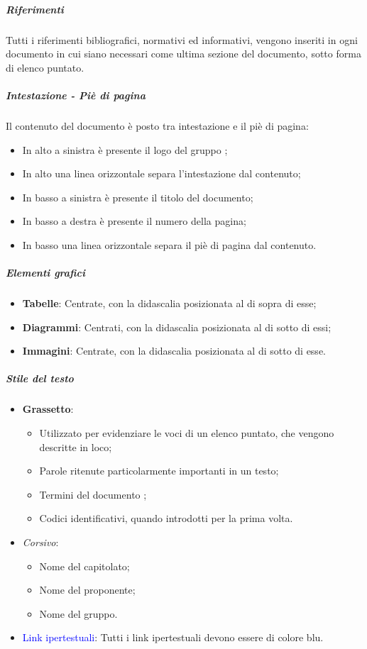 \subparagraph*{Riferimenti}
Tutti i riferimenti bibliografici, normativi ed informativi, vengono inseriti in ogni documento in cui siano necessari come ultima sezione del documento, sotto forma di elenco puntato.

\subparagraph*{Intestazione - Piè di pagina}
Il contenuto del documento è posto tra intestazione e il piè di pagina:

\begin{itemize}
\item In alto a sinistra è presente il logo del gruppo \Gruppo{};
\item In alto una linea orizzontale separa l’intestazione dal contenuto;
\item In basso a sinistra è presente il titolo del documento;
\item In basso a destra è presente il numero della pagina;
\item In basso una linea orizzontale separa il piè di pagina dal contenuto.
\end{itemize}

\subparagraph*{Elementi grafici}
\begin{itemize}
\item \textbf{Tabelle}: Centrate, con la didascalia posizionata al di sopra di esse;
\item \textbf{Diagrammi}: Centrati, con la didascalia posizionata al di sotto di essi;
\item \textbf{Immagini}: Centrate, con la didascalia posizionata al di sotto di esse.
\end{itemize}

\subparagraph*{Stile del testo}
\begin{itemize}
    \item \textbf{Grassetto}:
    \begin{itemize}
        \item Utilizzato per evidenziare le voci di un elenco puntato, che vengono descritte in loco;
        \item Parole ritenute particolarmente importanti in un testo;
        \item Termini del documento \Glossario{};
        \item Codici identificativi, quando introdotti per la prima volta.
    \end{itemize}
    \item \textit{Corsivo}:
    \begin{itemize}
        \item Nome del capitolato;
        \item Nome del proponente;
        \item Nome del gruppo.
    \end{itemize}
    \item \textcolor{blue}{Link ipertestuali}: Tutti i link ipertestuali devono essere di colore blu.
\end{itemize}

